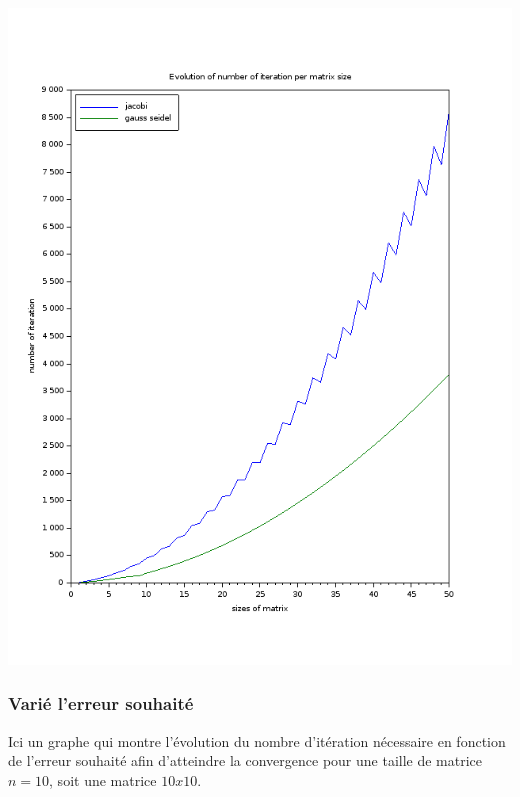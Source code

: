 \documentclass[11pt]{article}
\begin{document}
\includegraphics[scale=0.5]{img/number_of_iteration.png}

\subsubsection{Varié l'erreur souhaité}

Ici un graphe qui montre l'évolution du nombre d'itération nécessaire
en fonction de l'erreur souhaité afin d'atteindre la convergence pour
une taille de matrice $n = 10$, soit une matrice $10 x 10$.
\end{document}
